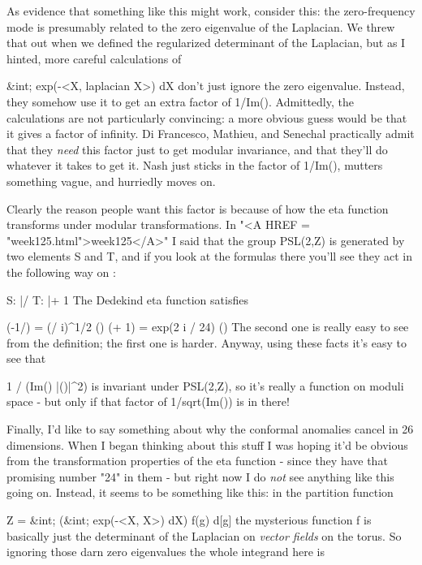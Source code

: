 As evidence that something like this might work, consider this: the
zero-frequency mode is presumably related to the zero eigenvalue of the
Laplacian.  We threw that out when we defined the regularized
determinant of the Laplacian, but as I hinted, more careful calculations
of

                 &int; exp(-<X, laplacian X>) dX
don't just ignore the zero eigenvalue.  Instead, they somehow use it to
get an extra factor of 1/\sqrt Im(\tau ).  Admittedly, the calculations are not
particularly convincing: a more obvious guess would be that it gives a
factor of infinity.  Di Francesco, Mathieu, and Senechal practically
admit that they \emph{need} this factor just to get modular invariance, 
and that they'll do whatever it
takes to get it.  Nash just sticks in the factor of 1/\sqrt Im(\tau ), mutters 
something vague, and hurriedly moves on.

Clearly the reason people want this factor is because of how the eta
function transforms under modular transformations.  In "<A HREF =
"week125.html">week125</A>" I said that the group PSL(2,Z) is
generated by two elements S and T, and if you look at the formulas there
you'll see they act in the following way on \tau :

                     S: \tau  |/\tau   
                     T: \tau  |\to  \tau  + 1
The Dedekind eta function satisfies 

                \eta (-1/\tau )  =      (\tau  / i)^{1/2} \eta (\tau )
                \eta (\tau  + 1) = exp(2 \pi  i / 24) \eta (\tau )
The second one is really easy to see from the definition; the first
one is harder.  Anyway, using these facts it's easy to see that 

                     1 / (\sqrt Im(\tau ) |\eta (\tau )|^{2})
is invariant under PSL(2,Z), so it's really a function on moduli
space - but only if that factor of 1/sqrt(Im(\tau )) is in there!

Finally, I'd like to say something about why the conformal anomalies
cancel in 26 dimensions.  When I began thinking about this stuff I
was hoping it'd be obvious from the transformation properties of the
eta function - since they have that promising number "24" in them - 
but right now I do \emph{not} see anything like this going on.  Instead,
it seems to be something like this: in the partition function

      Z = &int; (&int; exp(-<X, \Delta X>) dX) f(g) d[g]   
the mysterious function f is basically just the determinant of the
Laplacian on \emph{vector fields} on the torus.  So ignoring those 
darn zero eigenvalues the whole integrand here is

